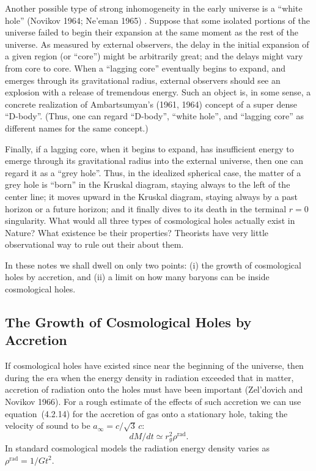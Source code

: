 Another possible type of strong inhomogeneity in the early universe is a
``white hole'' (Novikov 1964; Ne'eman 1965) \cite{Novikov1964, Neeman1965}. Suppose that some isolated
portions of the universe failed to begin their expansion at the same moment as
the rest of the universe. As measured by external observers, the delay in the
initial expansion of a given region (or ``core'') might be arbitrarily great; and the
delays might vary from core to core. When a ``lagging core'' eventually begins to
expand, and emerges through its gravitational radius, external observers should
see an explosion with a release of tremendous energy. Such an object is, in some
sense, a concrete realization of Ambartsumyan's (1961, 1964) concept of a super\-
dense ``D-body''. (Thus, one can regard ``D-body'', ``white hole'', and ``lagging
core'' as different names for the same concept.)

Finally, if a lagging core, when it begins to expand, has insufficient energy to
emerge through its gravitational radius into the external universe, then one can
regard it as a ``grey hole''. Thus, in the idealized spherical case, the matter of a
grey hole is ``born'' in the Kruskal diagram, staying always to the left of the center line; it moves
upward in the Kruskal diagram, staying always by a past horizon or a future
horizon; and it finally dives to its death in the terminal $r = 0$ singularity. What
would all three types of cosmological holes actually exist in Nature? What
existence be their properties? Theorists have very little observational way to rule out their
about them.

In these notes we shall dwell on only two points: (i) the growth of cosmological
holes by accretion, and (ii) a limit on how many baryons can be inside cosmological
holes.


\subsection{The Growth of Cosmological Holes by Accretion}
\label{sec:6.2}

If cosmological holes have existed since near the beginning of the universe,
then during the era when the energy density in radiation exceeded that in matter,
accretion of radiation onto the holes must have been important (Zel'dovich and
Novikov 1966).  For a rough estimate of the effects of such accretion we can use
equation~(4.2.14) for the accretion of gas onto a stationary hole, taking the
velocity of sound to be $a_\infty = c/\sqrt{3}\,c$:
%
\begin{equation}
\tag{6.2.1}
dM/dt \simeq r_g^2 \rho^{\text{rad}}\!.
\end{equation}
%
In standard cosmological models the radiation energy density varies as
$\rho^{\text{rad}} = 1/Gt^2$.

